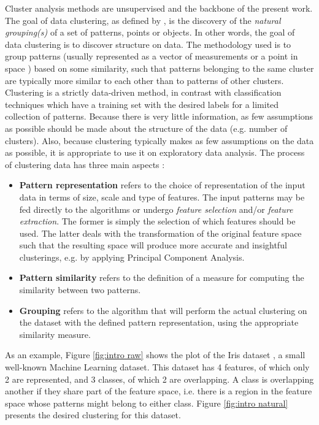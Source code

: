 Cluster analysis methods are unsupervised and the backbone of the present work.
The goal of data clustering, as defined by \cite{Jain2010}, is the discovery of the \textit{natural grouping(s)} of a set of patterns, points or objects.
In other words, the goal of data clustering is to discover structure on data.
The methodology used is to group patterns (usually represented as a vector of measurements or a point in space \cite{Jain1999}) based on some similarity, such that patterns belonging to the same cluster are typically more similar to each other than to patterns of other clusters.
Clustering is a strictly data-driven method, in contrast with classification techniques which have a training set with the desired labels for a limited collection of patterns.
Because there is very little information, as few assumptions as possible should be made about the structure of the data (e.g. number of clusters).
Also, because clustering typically makes as few assumptions on the data as possible, it is appropriate to use it on exploratory data analysis.
The process of clustering data has three main aspects \cite{Jain1999}:

\begin{itemize}
    \item \textbf{Pattern representation} refers to the choice of representation of the input data in terms of size, scale and type of features.
    The input patterns may be fed directly to the algorithms or undergo \emph{feature selection} and/or \emph{feature extraction}.
    The former is simply the selection of which features should be used.
    The latter deals with the transformation of the original feature space such that the resulting space will produce more accurate and insightful clusterings, e.g. by applying Principal Component Analysis.

    \item \textbf{Pattern similarity} refers to the definition of a measure for computing the similarity between two patterns.
    \item \textbf{Grouping} refers to the algorithm that will perform the actual clustering on the dataset with the defined pattern representation, using the appropriate similarity measure.
\end{itemize}

As an example, Figure \ref{fig:intro raw} shows the plot of the Iris dataset \cite{anderson1936species,fisher1936use}, a small well-known Machine Learning dataset.
This dataset has 4 features, of which only 2 are represented, and 3 classes, of which 2 are overlapping.
A class is overlapping another if they share part of the feature space, i.e. there is a region in the feature space whose patterns might belong to either class.
Figure \ref{fig:intro natural} presents the desired clustering for this dataset.

